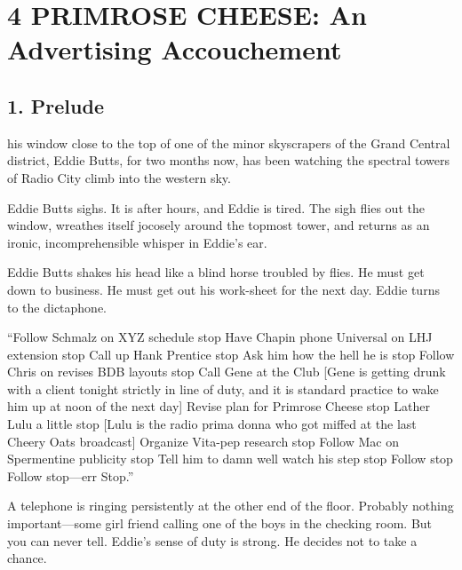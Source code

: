 \documentclass[openany,nobib]{tufte-book}
\let\oldchapter\chapter
\def\chapter{%
  \setcounter{footnote}{0}%
  \oldchapter
}
\begin{document}
\chapter[4 \hspace*{1mm} PRIMROSE CHEESE: An Advertising Accouchement]{4 PRIMROSE CHEESE: An Advertising Accouchement}

\section{1. Prelude}

 his window close to the top of one of the minor skyscrapers of the
Grand Central district, Eddie Butts, for two months now, has been
watching the spectral towers of Radio City climb into the western sky.



Eddie Butts sighs. It is after hours, and Eddie is tired. The sigh flies
out the window, wreathes itself jocosely around the topmost tower, and
returns as an ironic, incomprehensible whisper in Eddie's ear.

Eddie Butts shakes his head like a blind horse troubled by flies. He
must get down to business. He must get out his work-sheet for the next
day. Eddie turns to the dictaphone.

``Follow Schmalz on XYZ schedule stop Have Chapin phone Universal on LHJ
extension stop Call up Hank Prentice stop Ask him how the hell he is
stop Follow Chris on revises BDB layouts stop Call Gene at the Club
{[}Gene is getting drunk with a client tonight strictly in line of duty,
and it is standard practice to wake him up at noon of the next day{]}
Revise plan for Primrose Cheese stop Lather Lulu a little stop {[}Lulu
is the radio prima donna who got miffed at the last Cheery Oats
broadcast{]} Organize Vita-pep research stop Follow Mac on Spermentine
publicity stop Tell him to damn well watch his step stop Follow stop
Follow stop---err Stop.''

A telephone is ringing persistently at the other end of the floor.
Probably nothing important---some girl friend calling one of the boys in
the checking room. But you can never tell. Eddie's sense of duty is
strong. He decides not to take a chance.
\end{document}
